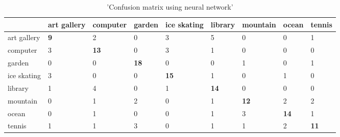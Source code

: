 \documentclass[12pt]{article}
\newenvironment{problem}[2][Problem]{\begin{trivlist}
\item[\hskip \labelsep {\bfseries #1}\hskip \labelsep {\bfseries #2.}]}{\end{trivlist}}
\begin{document}
\begin{problem}{2.7}
\begin{table}


\begin{tabular}{ |p{1.9cm} | P{1.35cm} | P{1.4cm}|  P{1.4cm}|  P{1.4cm} | P{1.4cm}  | P{1.4cm} | P{1.4cm} | P{1.4cm} |}
\hline
 & art gallery &  computer & garden & ice skating & library & mountain & ocean & tennis\\
\hline
art gallery & \textbf{9} & 2 & 0 & 3 & 5 & 0 & 0 & 1\\
computer & 3 & \textbf{13} & 0 & 3 & 1 & 0 & 0 & 0\\
garden & 0 & 0 & \textbf{18} & 0 & 0 & 1 & 0 & 1\\
ice skating & 3 & 0 & 0  & \textbf{15} & 1 & 0 & 1 & 0\\
library    & 1 & 4 & 0 & 1 & \textbf{14} & 0 & 0 & 0\\
mountain   &  0 & 1 & 2 & 0 & 1 & \textbf{12} & 2 & 2\\
ocean    & 0 & 1 & 0 & 0 & 1 & 3 & \textbf{14} & 1\\
tennis & 1 & 1 & 3 & 0 & 1 & 1 & 2 & \textbf{11}\\
\hline


\end{tabular}
\caption{'Confusion matrix using neural network'}
\label{tab:2}
\end{table}


\end{problem}
\end{document}
